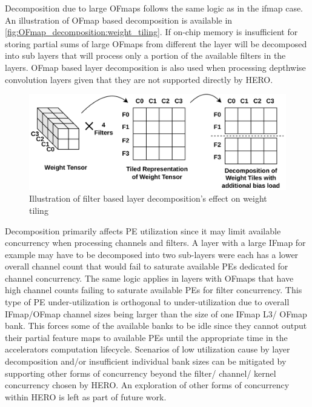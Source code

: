Decomposition due to large OFmaps follows the same logic as in the ifmap case.
An illustration of OFmap based decomposition is available in
\autoref{fig:OFmap_decomposition:weight_tiling}. If on-chip memory is
insufficient for storing partial sums of large OFmaps from different the layer will be
decomposed into sub layers that will process only a portion of the available
filters in the layers. OFmap based layer decomposition is also used when
processing depthwise convolution layers given that they are not supported
directly by HERO.  

\begin{figure}[ht]
    \centering
    \includegraphics[scale=0.4]{fig/OFmap_decomposition_tiling_repr.pdf}
    \caption{Illustration of filter based layer decomposition's effect on weight tiling}
    \label{fig:OFmap_decomposition:weight_tiling}
\end{figure}

Decomposition primarily affects PE utilization since it may limit available
concurrency when processing channels and filters. A layer with a large IFmap for
example may have to be decomposed into two sub-layers were each has a lower
overall channel count that would fail to saturate available PEs dedicated for
channel concurrency. The same logic applies in layers with OFmaps that have high
channel counts failing to saturate available PEs for filter concurrency. This
type of PE under-utilization is orthogonal to under-utilization due to overall
IFmap/OFmap channel sizes being larger than the size of one IFmap L3/ OFmap
bank. This forces some of the available banks to be idle since they cannot
output their partial feature maps to available PEs until the appropriate time in
the accelerators computation lifecycle. Scenarios of low utilization cause by
layer decomposition and/or insufficient individual bank sizes can be mitigated
by supporting other forms of concurrency beyond the filter/ channel/ kernel
concurrency chosen by HERO. An exploration of other forms of concurrency within
HERO is left as part of future work. 

